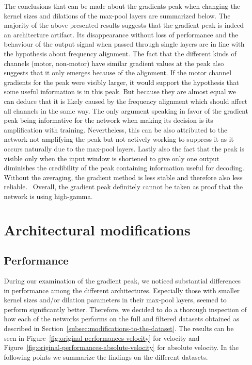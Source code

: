 The conclusions that can be made about the gradients peak when changing the kernel sizes and dilations of the max-pool layers are summarized below.
The majority of the above presented results suggests that the gradient peak is indeed an architecture artifact.
Its disappearance without loss of performance and the behaviour of the output signal when passed through single layers are in line with the hypothesis about frequency alignment.
The fact that the different kinds of channels (motor, non-motor) have similar gradient values at the peak also suggests that it only emerges because of the alignment.
If the motor channel gradients for the peak were visibly larger, it would support the hypothesis that some useful information is in this peak.
But because they are almost equal we can deduce that it is likely caused by the frequency alignment which should affect all channels in the same way.
The only argument speaking in favor of the gradient peak being informative for the network when making its decision is its amplification with training.
Nevertheless, this can be also attributed to the network not amplifying the peak but not actively working to suppress it as it occurs naturally due to the max-pool layers.
Lastly also the fact that the peak is visible only when the input window is shortened to give only one output diminishes the credibility of the peak containing information useful for decoding.
Without the averaging, the gradient method is less stable and therefore also less reliable.~
Overall, the gradient peak definitely cannot be taken as proof that the network is using high-gamma.

\section{Architectural modifications}\label{sec:architectural-modifications}
\subsection{Performance}\label{subsec:performance}
During our examination of the gradient peak, we noticed substantial differences in performance among the different architectures.
Especially those with smaller kernel sizes and/or dilation parameters in their max-pool layers, seemed to perform significantly better.
Therefore, we decided to do a thorough inspection of how each of the networks performs on the full and filtered datasets obtained as described in Section~\ref{subsec:modifications-to-the-dataset}.
The results can be seen in Figure~\ref{fig:original-performances-velocity} for velocity and Figure~\ref{fig:original-performances-absolute-velocity} for absolute velocity.
In the following points we summarize the findings on the different datasets.

